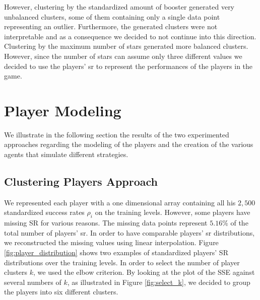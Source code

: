 However, clustering by the standardized amount of booster generated very unbalanced clusters, some of them containing only a single data point representing an outlier. Furthermore, the generated clusters were not interpretable and as a consequence we decided to not continue into this direction. Clustering by the maximum number of stars generated more balanced clusters. However, since the number of stars can assume only three different values we decided to use the players' \acs{sr} to represent the performances of the players in the game. 

\section{Player Modeling}
We illustrate in the following section the results of the two experimented approaches regarding the modeling of the players and the creation of the various agents that simulate different strategies.


\subsection{Clustering Players Approach}
We represented each player with a one dimensional array containing all his $2,500$ standardized success rates $\rho_i$ on the training levels. However, some players have missing SR for various reasons. The missing data points represent $5.16\%$ of the total number of players' \acs{sr}. In order to have comparable players' \acs{sr} distributions, we reconstructed the missing values using linear interpolation.
Figure \ref{fig:player_distribution} shows two examples of standardized players' SR distributions over the training levels. In order to select the number of player clusters $k$, we used the elbow criterion. By looking at the plot of the SSE against several numbers of $k$, as illustrated in Figure \ref{fig:select_k}, we decided to group the players into six different clusters. 


